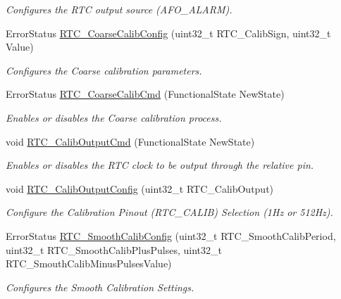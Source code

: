 \begin{DoxyCompactItemize}
\begin{DoxyCompactList}\small\item\em Configures the R\-T\-C output source (A\-F\-O\-\_\-\-A\-L\-A\-R\-M). \end{DoxyCompactList}\item 
Error\-Status \hyperlink{group___r_t_c_gaa3bb10170a2c70ac9ce3e41c611bdd43}{R\-T\-C\-\_\-\-Coarse\-Calib\-Config} (uint32\-\_\-t R\-T\-C\-\_\-\-Calib\-Sign, uint32\-\_\-t Value)
\begin{DoxyCompactList}\small\item\em Configures the Coarse calibration parameters. \end{DoxyCompactList}\item 
Error\-Status \hyperlink{group___r_t_c_ga008ae7173b2befe876f5e76686bc9089}{R\-T\-C\-\_\-\-Coarse\-Calib\-Cmd} (Functional\-State New\-State)
\begin{DoxyCompactList}\small\item\em Enables or disables the Coarse calibration process. \end{DoxyCompactList}\item 
void \hyperlink{group___r_t_c_ga25eaa2de5ee858a4572d5fb1eb146ff8}{R\-T\-C\-\_\-\-Calib\-Output\-Cmd} (Functional\-State New\-State)
\begin{DoxyCompactList}\small\item\em Enables or disables the R\-T\-C clock to be output through the relative pin. \end{DoxyCompactList}\item 
void \hyperlink{group___r_t_c_ga2139adc802bdb6882904c0b855d50b29}{R\-T\-C\-\_\-\-Calib\-Output\-Config} (uint32\-\_\-t R\-T\-C\-\_\-\-Calib\-Output)
\begin{DoxyCompactList}\small\item\em Configure the Calibration Pinout (R\-T\-C\-\_\-\-C\-A\-L\-I\-B) Selection (1\-Hz or 512\-Hz). \end{DoxyCompactList}\item 
Error\-Status \hyperlink{group___r_t_c_ga91a28dcc7d45340a469dd8b8c029f841}{R\-T\-C\-\_\-\-Smooth\-Calib\-Config} (uint32\-\_\-t R\-T\-C\-\_\-\-Smooth\-Calib\-Period, uint32\-\_\-t R\-T\-C\-\_\-\-Smooth\-Calib\-Plus\-Pulses, uint32\-\_\-t R\-T\-C\-\_\-\-Smouth\-Calib\-Minus\-Pulses\-Value)
\begin{DoxyCompactList}\small\item\em Configures the Smooth Calibration Settings. \end{DoxyCompactList}\item 

\end{DoxyCompactItemize}

